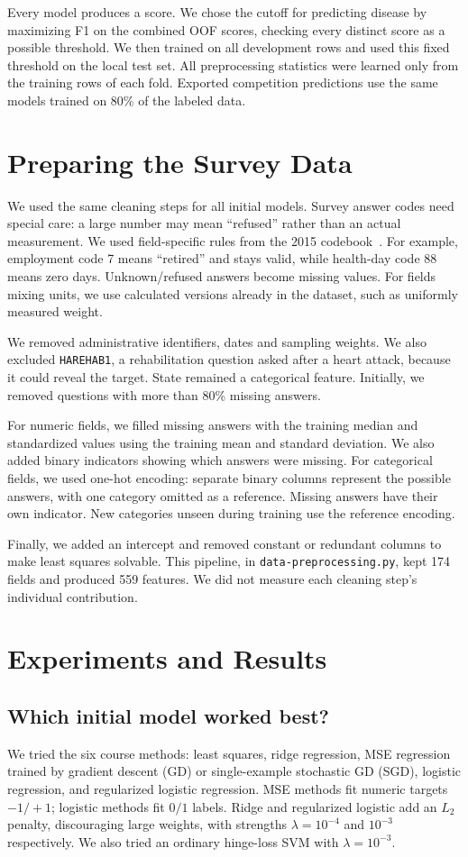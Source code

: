 \documentclass[10pt,conference,compsocconf,a4paper]{latex-example-paper/IEEEtran}
\begin{document}
Every model produces a score. We chose the cutoff for predicting disease
by maximizing F1 on the combined OOF scores, checking every distinct score
as a possible threshold. We then trained on all development rows and
used this fixed threshold on the local test set. All preprocessing statistics were learned only from the training rows of
each fold. Exported competition predictions use the same models trained
on 80\% of the labeled data.

\section{Preparing the Survey Data}
We used the same cleaning steps for all initial models. Survey answer codes
need special care: a large number may mean ``refused'' rather than an
actual measurement. We used field-specific rules from the 2015
codebook~\cite{codebook}. For example, employment code 7 means ``retired''
and stays valid, while health-day code 88 means zero days.
Unknown/refused answers become missing values. For fields mixing units, we use calculated versions already in the
dataset, such as uniformly measured weight.

We removed administrative identifiers, dates and sampling weights.
We also excluded \texttt{HAREHAB1}, a rehabilitation question asked after
a heart attack, because it could reveal the target. State remained a
categorical feature. Initially, we removed questions with more than 80\%
missing answers.

For numeric fields, we filled missing answers with the training median
and standardized values using the training mean and standard deviation.
We also added binary indicators showing which answers were missing.
For categorical fields, we used one-hot encoding: separate binary columns
represent the possible answers, with one category omitted as a reference.
Missing answers have their own indicator. New categories unseen during
training use the reference encoding.

Finally, we added an intercept and removed constant or redundant columns
to make least squares solvable. This pipeline, in
\texttt{data-preprocessing.py}, kept 174 fields and produced 559 features.
We did not measure each cleaning step's individual contribution.

\section{Experiments and Results}
\subsection{Which initial model worked best?}
We tried the six course methods: least squares, ridge regression, MSE
regression trained by gradient descent (GD) or single-example stochastic
GD (SGD), logistic regression, and regularized logistic regression.
MSE methods fit numeric targets $-1/+1$; logistic methods fit $0/1$ labels.
Ridge and regularized logistic add an $L_2$ penalty, discouraging large
weights, with strengths $\lambda=10^{-4}$ and $10^{-3}$ respectively.
We also tried an ordinary hinge-loss SVM with $\lambda=10^{-3}$.
\end{document}
